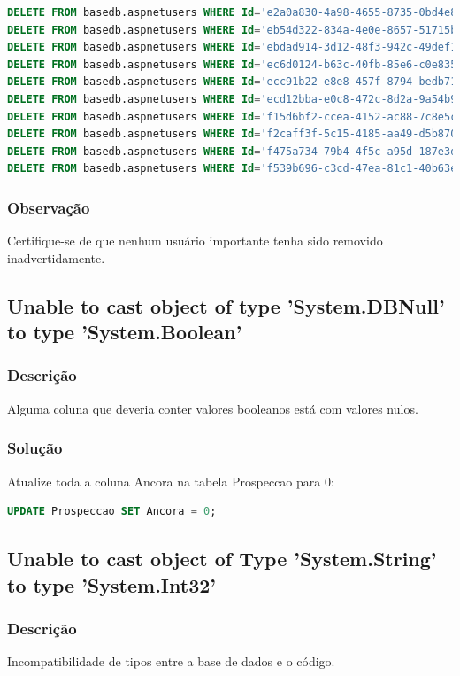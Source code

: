 \documentclass[12pt]{article}
\begin{document}
\begin{lstlisting}[language=SQL, breaklines=true]
DELETE FROM basedb.aspnetusers WHERE Id='e2a0a830-4a98-4655-8735-0bd4e8264622';
DELETE FROM basedb.aspnetusers WHERE Id='eb54d322-834a-4e0e-8657-51715bd41ecb';
DELETE FROM basedb.aspnetusers WHERE Id='ebdad914-3d12-48f3-942c-49def121dcd7';
DELETE FROM basedb.aspnetusers WHERE Id='ec6d0124-b63c-40fb-85e6-c0e83518ac4e';
DELETE FROM basedb.aspnetusers WHERE Id='ecc91b22-e8e8-457f-8794-bedb713b5d01';
DELETE FROM basedb.aspnetusers WHERE Id='ecd12bba-e0c8-472c-8d2a-9a54b9a40873';
DELETE FROM basedb.aspnetusers WHERE Id='f15d6bf2-ccea-4152-ac88-7c8e5c191f1f';
DELETE FROM basedb.aspnetusers WHERE Id='f2caff3f-5c15-4185-aa49-d5b870b17b80';
DELETE FROM basedb.aspnetusers WHERE Id='f475a734-79b4-4f5c-a95d-187e3d4cb3e9';
DELETE FROM basedb.aspnetusers WHERE Id='f539b696-c3cd-47ea-81c1-40b63e6f7435';
\end{lstlisting}

\subsubsection{Observação}
Certifique-se de que nenhum usuário importante tenha sido removido inadvertidamente.

\subsection{Unable to cast object of type 'System.DBNull' to type 'System.Boolean'}
\subsubsection{Descrição}
Alguma coluna que deveria conter valores booleanos está com valores nulos.

\subsubsection{Solução}
Atualize toda a coluna Ancora na tabela Prospeccao para 0:
\begin{lstlisting}[language=SQL]
UPDATE Prospeccao SET Ancora = 0;
\end{lstlisting}

\subsection{Unable to cast object of Type 'System.String' to type 'System.Int32'}
\subsubsection{Descrição}
Incompatibilidade de tipos entre a base de dados e o código.
\end{document}
